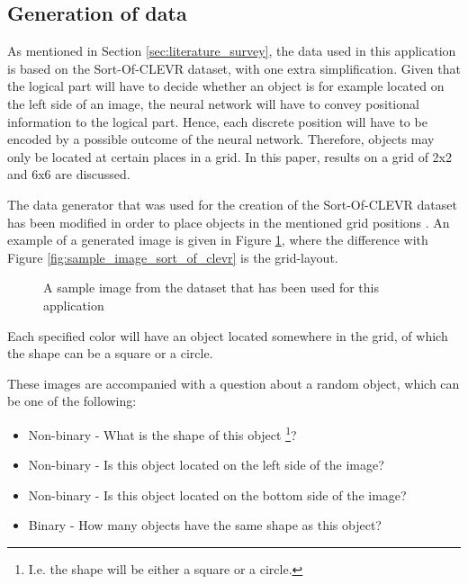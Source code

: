 \documentclass[english]{sobraep}
\begin{document}
\subsection{Generation of data}
As mentioned in Section \ref{sec:literature_survey}, the data used in this application is based on the Sort-Of-CLEVR dataset, with one extra simplification. Given that the logical part will have to decide whether an object is for example located on the left side of an image, the neural network will have to convey positional information to the logical part. Hence, each discrete position will have to be encoded by a possible outcome of the neural network. Therefore, objects may only be located at certain places in a grid. In this paper, results on a grid of 2x2 and 6x6 are discussed.

The data generator that was used for the creation of the Sort-Of-CLEVR dataset has been modified in order to place objects in the mentioned grid positions \cite{sort_of_clevr_dataset}. An example of a generated image is given in Figure \ref{fig:sample_image_own_dataset}, where the difference with Figure \ref{fig:sample_image_sort_of_clevr} is the grid-layout.

\begin{figure}[htp]
    \begin{center}
    \captionsetup{justification=centering}
    \caption{A sample image from the dataset that has been used for this application}
    \label{fig:sample_image_own_dataset}
    \end{center}
\end{figure}

Each specified color will have an object located somewhere in the grid, of which the shape can be a square or a circle.

These images are accompanied with a question about a random object, which can be one of the following:
\begin{itemize}
    \item Non-binary - What is the shape of this object \footnote{I.e. the shape will be either a square or a circle.}?
    \item Non-binary - Is this object located on the left side of the image?
    \item Non-binary - Is this object located on the bottom side of the image?
    \item Binary - How many objects have the same shape as this object?
\end{itemize}
\end{document}
